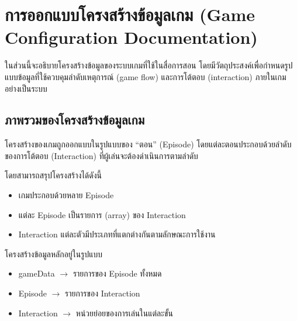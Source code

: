 



\section{การออกแบบโครงสร้างข้อมูลเกม (Game Configuration Documentation)}

ในส่วนนี้จะอธิบายโครงสร้างข้อมูลของระบบเกมที่ใช้ในสื่อการสอน โดยมีวัตถุประสงค์เพื่อกำหนดรูปแบบข้อมูลที่ใช้ควบคุมลำดับเหตุการณ์ (game flow) และการโต้ตอบ (interaction) ภายในเกมอย่างเป็นระบบ

\subsection{ภาพรวมของโครงสร้างข้อมูลเกม}

โครงสร้างของเกมถูกออกแบบในรูปแบบของ ``ตอน'' (Episode) โดยแต่ละตอนประกอบด้วยลำดับของการโต้ตอบ (Interaction) ที่ผู้เล่นจะต้องดำเนินการตามลำดับ

โดยสามารถสรุปโครงสร้างได้ดังนี้

\begin{itemize}
    \item เกมประกอบด้วยหลาย Episode
    \item แต่ละ Episode เป็นรายการ (array) ของ Interaction
    \item Interaction แต่ละตัวมีประเภทที่แตกต่างกันตามลักษณะการใช้งาน
\end{itemize}

โครงสร้างข้อมูลหลักอยู่ในรูปแบบ

\begin{itemize}
    \item gameData $\rightarrow$ รายการของ Episode ทั้งหมด
    \item Episode $\rightarrow$ รายการของ Interaction
    \item Interaction $\rightarrow$ หน่วยย่อยของการเล่นในแต่ละขั้น
\end{itemize}

